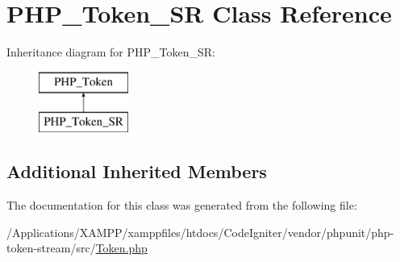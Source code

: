 \hypertarget{class_p_h_p___token___s_r}{}\section{P\+H\+P\+\_\+\+Token\+\_\+\+SR Class Reference}
\label{class_p_h_p___token___s_r}
Inheritance diagram for P\+H\+P\+\_\+\+Token\+\_\+\+SR\+:\begin{figure}[H]
\begin{center}
\leavevmode
\includegraphics[height=2.000000cm]{class_p_h_p___token___s_r}
\end{center}
\end{figure}
\subsection*{Additional Inherited Members}


The documentation for this class was generated from the following file\+:\begin{DoxyCompactItemize}
\item 
/\+Applications/\+X\+A\+M\+P\+P/xamppfiles/htdocs/\+Code\+Igniter/vendor/phpunit/php-\/token-\/stream/src/\mbox{\hyperlink{_token_8php}{Token.\+php}}\end{DoxyCompactItemize}
